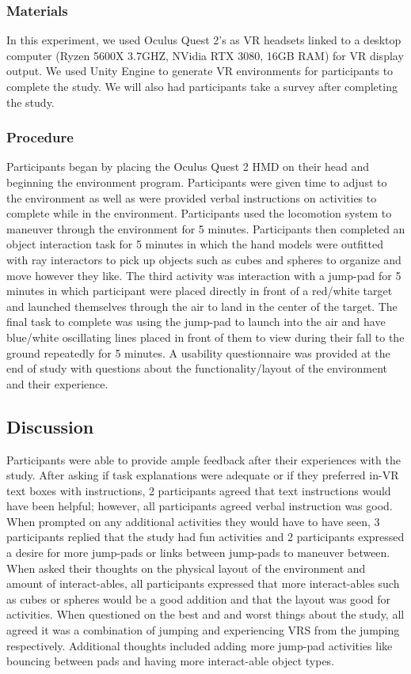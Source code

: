 \documentclass[sigconf]{acmart}
\begin{document}
\subsubsection{Materials}
In this experiment, we used Oculus Quest 2’s as VR headsets linked to a desktop computer (Ryzen 5600X 3.7GHZ, NVidia RTX 3080, 16GB RAM) for VR display output. We used Unity Engine to generate VR environments for participants to complete the study. We will also had participants take a survey after completing the study.

\subsubsection{Procedure}
Participants began by placing the Oculus Quest 2 HMD on their head and beginning the environment program. Participants were given time to adjust to the environment as well as were provided verbal instructions on activities to complete while in the environment. Participants used the locomotion system to maneuver through the environment for 5 minutes. Participants then completed an object interaction task for 5 minutes in which the hand models were outfitted with ray interactors to pick up objects such as cubes and spheres to organize and move however they like. The third activity was interaction with a jump-pad for 5 minutes in which participant were placed directly in front of a red/white target and launched themselves through the air to land in the center of the target. The final task to complete was using the jump-pad to launch into the air and have blue/white oscillating lines placed in front of them to view during their fall to the ground repeatedly for 5 minutes. A usability questionnaire was provided at the end of study with questions about the functionality/layout of the environment and their experience.

\subsection{Discussion}
Participants were able to provide ample feedback after their experiences with the study. After asking if task explanations were adequate or if they preferred in-VR text boxes with instructions, 2 participants agreed that text instructions would have been helpful; however, all participants agreed verbal instruction was good. When prompted on any additional activities they would have to have seen, 3 participants replied that the study had fun activities and 2 participants expressed a desire for more jump-pads or links between jump-pads to maneuver between. When asked their thoughts on the physical layout of the environment and amount of interact-ables, all participants expressed that more interact-ables such as cubes or spheres would be a good addition and that the layout was good for activities. When questioned on the best and and worst things about the study, all agreed it was a combination of jumping and experiencing VRS from the jumping respectively. Additional thoughts included adding more jump-pad activities like bouncing between pads and having more interact-able object types.
\end{document}
